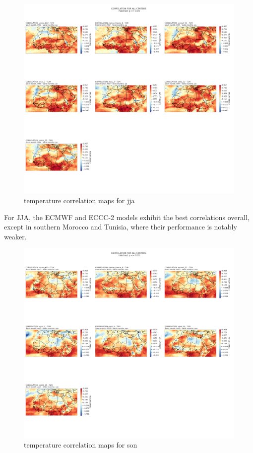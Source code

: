 \begin{figure}[H]
    \centering
    \includegraphics[width=1\linewidth]{plots/det/corr/CORR_jja_t2m.png}
    \caption{temperature correlation maps for jja}
   
\end{figure}
For JJA, the ECMWF and ECCC-2 models exhibit the best correlations overall, except in southern Morocco and Tunisia, where their performance is notably weaker.
\begin{figure}[H]
    \centering
    \includegraphics[width=1\linewidth]{plots/det/corr/CORR_son_t2m.png}
    \caption{temperature correlation maps for son}
   
\end{figure}
